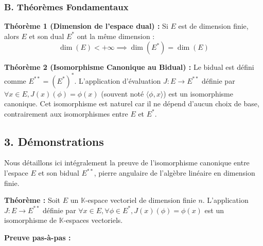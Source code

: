 \hypertarget{b.-thuxe9oruxe8mes-fondamentaux}{%
\subsubsection{B. Théorèmes
Fondamentaux}\label{b.-thuxe9oruxe8mes-fondamentaux}}

\textbf{Théorème 1 (Dimension de l'espace dual) :} Si \(E\) est de
dimension finie, alors \(E\) et son dual \(E^*\) ont la même dimension :
\[ \dim(E) < +\infty \implies \dim(E^*) = \dim(E) \]

\textbf{Théorème 2 (Isomorphisme Canonique au Bidual) :} Le bidual est
défini comme \(E^{**} = (E^*)^*\). L'application d'évaluation
\(J : E \to E^{**}\) définie par
\(\forall x \in E, J(x)(\phi) = \phi(x)\) (souvent noté
\(\langle \phi, x \rangle\)) est un isomorphisme canonique. Cet
isomorphisme est naturel car il ne dépend d'aucun choix de base,
contrairement aux isomorphismes entre \(E\) et \(E^*\).

\hypertarget{duxe9monstrations}{%
\subsection{3. Démonstrations}\label{duxe9monstrations}}

Nous détaillons ici intégralement la preuve de l'isomorphisme canonique
entre l'espace \(E\) et son bidual \(E^{**}\), pierre angulaire de
l'algèbre linéaire en dimension finie.

\textbf{Théorème :} Soit \(E\) un \(\mathbb{K}\)-espace vectoriel de
dimension finie \(n\). L'application \(J : E \to E^{**}\) définie par
\(\forall x \in E, \forall \phi \in E^*, J(x)(\phi) = \phi(x)\) est un
isomorphisme de \(\mathbb{K}\)-espaces vectoriels.

\textbf{Preuve pas-à-pas :}

